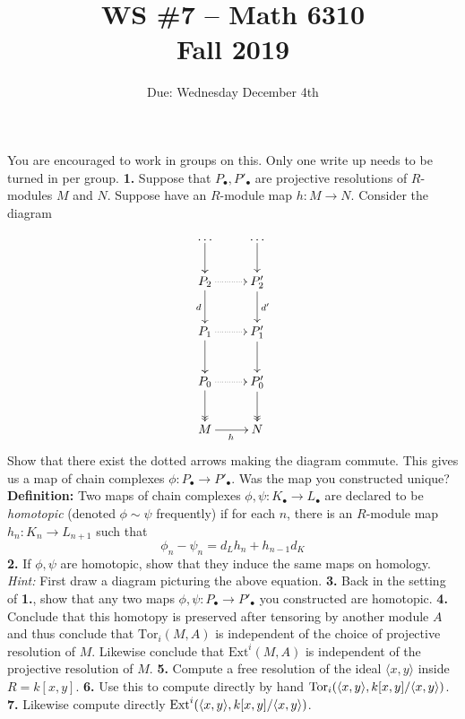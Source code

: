\documentclass[11pt]{amsart}
\theoremstyle{theorem}
\renewcommand{\to}[1][]{\xrightarrow{\ #1\ }}
\newcommand{\Ext}{\textnormal{Ext}}
\newcommand{\Tor}{\textnormal{Tor}}
\begin{document}
\title{WS \#7 -- Math 6310\\Fall 2019}
\author{Due: Wednesday December 4th}
\maketitle

You are encouraged to work in groups on this.  Only one write up needs to be turned in per group.  
\vskip 6pt
\noindent
{\bf 1.}  Suppose that $P_{\bullet}, P'_{\bullet}$ are projective resolutions of $R$-modules $M$ and $N$.  Suppose have an $R$-module map $h : M \to N$.  Consider the diagram
\[
\xymatrix{
\ldots \ar[d]  & \ldots \ar[d] \\
P_{2} \ar[d]_d \ar@{.>}[r] & P'_{2} \ar[d]^{d'} \\
P_{1} \ar[d] \ar@{.>}[r] & P'_{1} \ar[d] \\
P_{0} \ar@{->>}[d] \ar@{.>}[r] & P'_{0} \ar@{->>}[d] \\
M \ar[r]_{h} & N \\
}
\]
Show that there exist the dotted arrows making the diagram commute.  This gives us a map of chain complexes $\phi : P_{\bullet} \to P'_{\bullet}$.  Was the map you constructed unique?
\newpage 
\noindent
{\bf Definition:}  Two maps of chain complexes $\phi, \psi: K_{\bullet} \to L_{\bullet}$ are declared to be \emph{homotopic} (denoted $\phi \sim \psi$ frequently) if for each $n$, there is an $R$-module map $h_n : K_n \to L_{n+1}$ such that
\[
\phi_n - \psi_n = d_L h_n + h_{n-1} d_K
\]
\vskip 9pt
\noindent
{\bf 2.}  If $\phi, \psi$ are homotopic, show that they induce the same maps on homology.  
\vskip 3pt
\emph{Hint:}  First draw a diagram picturing the above equation.
\newpage
\noindent
{\bf 3.}  Back in the setting of {\bf 1.}, show that any two maps $\phi, \psi : P_{\bullet} \to P'_{\bullet}$ you constructed are homotopic.  
\newpage
\noindent
{\bf 4.}  
Conclude that this homotopy is preserved after tensoring by another module $A$ and thus conclude that $\mathrm{Tor}_i(M, A)$ is independent of the choice of projective resolution of $M$.  Likewise conclude that $\mathrm{Ext}^i(M, A)$ is independent of the projective resolution of $M$.
\newpage
\noindent
{\bf 5.}  Compute a free resolution of the ideal $\langle x,y \rangle$ inside $R = k[x,y]$.
\newpage
\noindent
{\bf 6.}  Use this to compute directly by hand $\Tor_i( \langle x,y \rangle, k[x,y]/\langle x,y \rangle)$.
\newpage
\noindent
{\bf 7.}  Likewise compute directly $\Ext^i( \langle x,y \rangle, k[x,y]/\langle x,y \rangle)$.
\end{document}
